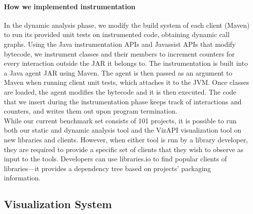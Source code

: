 \paragraph{How we implemented instrumentation}
In the dynamic analysis phase, we modify the build system of each
client (Maven) to run its provided unit tests on instrumented code,
obtaining dynamic call graphs. 
Using the Java instrumentation APIs and Javassist APIs that modify bytecode,
we instrument classes and their members to increment counters for every interaction outside the JAR it belongs to.
The instrumentation is built into a Java agent JAR using Maven.
The agent is then passed as an argument to Maven when running client unit tests, which attaches it to the JVM.
Once classes are loaded, the agent modifies the bytecode and it is then executed.
The code that we insert during the instrumentation phase keeps track of interactions and counters,
and writes them out upon program termination. \\


While our current benchmark set consists of 101 projects, it is possible to run both our static and dynamic analysis tool and the VizAPI visualization tool on new libraries and clients. However, when either tool is run by a library developer, they are required to provide a specific set of clients that they wish to observe as input to the tools. Developers can use libraries.io to find popular clients of libraries---it provides a dependency tree based on projects' packaging information.


\subsection{Visualization System}
\label{subsec:vis-system}

